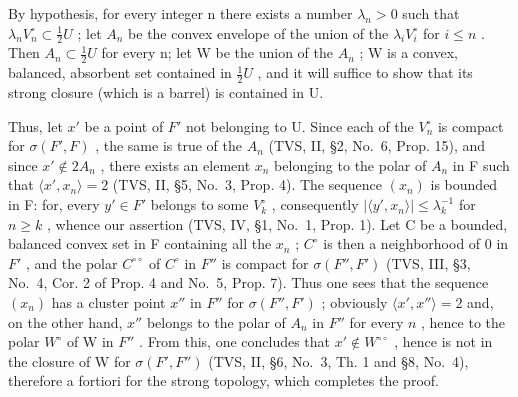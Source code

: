 By hypothesis, for every integer n there exists a number \(\lambda_{n}>0\) such that \(\lambda_{n}V_{n}^{\circ}\subset\frac{1}{2}U\) ; let \(A_{n}\) be the convex envelope of the union of the \(\lambda_{i}V_{i}^{\circ}\) for \(i\leqslant n\) . Then \(A_{n}\subset\frac{1}{2}U\) for every n; let W be the union of the \(A_{n}\) ; W is a convex, balanced, absorbent set contained in \(\frac{1}{2}U\) , and it will suffice to show that its strong closure (which is a barrel) is contained in U.

Thus, let \(x'\) be a point of \(F'\) not belonging to U. Since each of the \(V_n^\circ\) is compact for \(\sigma(F', F)\) , the same is true of the \(A_n\) (TVS, II, §2, No.~6, Prop. 15), and since \(x' \notin 2A_n\) , there exists an element \(x_n\) belonging to the polar of \(A_n\) in F such that \(\langle x', x_n \rangle = 2\) (TVS, II, §5, No.~3, Prop. 4). The sequence \((x_n)\) is bounded in F: for, every \(y' \in F'\) belongs to some \(V_k^\circ\) , consequently \(|\langle y', x_n \rangle| \leqslant \lambda_k^{-1}\) for \(n \geqslant k\) , whence our assertion (TVS, IV, §1, No.~1, Prop. 1). Let C be a bounded, balanced convex set in F containing all the \(x_n\) ; \(C^\circ\) is then a neighborhood of 0 in \(F'\) , and the polar \(C^{\circ\circ}\) of \(C^\circ\) in \(F''\) is compact for \(\sigma(F'', F')\) (TVS, III, §3, No.~4, Cor. 2 of Prop. 4 and No.~5, Prop. 7). Thus one sees that the sequence \((x_n)\) has a cluster point \(x''\) in \(F''\) for \(\sigma(F'', F')\) ; obviously \(\langle x', x'' \rangle = 2\) and, on the other hand, \(x''\) belongs to the polar of \(A_n\) in \(F''\) for every \(n\) , hence to the polar \(W^\circ\) of W in \(F''\) . From this, one concludes that \(x' \notin W^{\circ\circ}\) , hence is not in the closure of W for \(\sigma(F', F'')\) (TVS, II, §6, No.~3, Th. 1 and §8, No.~4), therefore a fortiori for the strong topology, which completes the proof.
